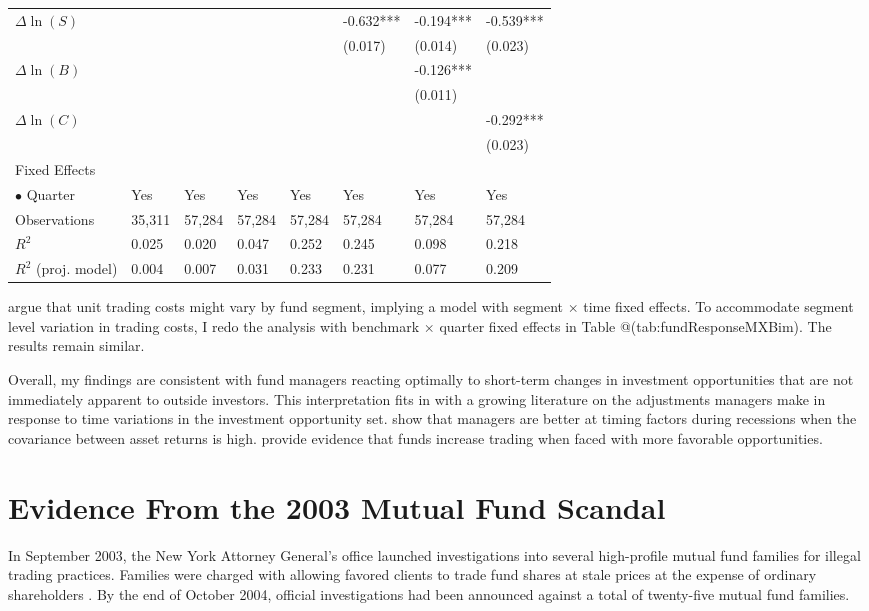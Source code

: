 \documentclass[openany]{book}
\theoremstyle{definition}
\theoremstyle{definition}
\theoremstyle{definition}
\theoremstyle{remark}
\begin{document}
\begin{table}[ht]
\begin{tabularx}{0.975\textwidth}{lYYYYYYY}
  $\Delta\ln(S)$ &  &  &  &  & -0.632*** & -0.194*** & -0.539*** \\ 
   &  &  &  &  & (0.017) & (0.014) & (0.023) \\ 
  $\Delta\ln(B)$ &  &  &  &  &  & -0.126*** &  \\ 
   &  &  &  &  &  & (0.011) &  \\ 
  $\Delta\ln(C)$ &  &  &  &  &  &  & -0.292*** \\ 
   &  &  &  &  &  &  & (0.023) \\ 
  Fixed Effects &  &  &  &  &  &  &  \\ 
  $\bullet$ Quarter & Yes & Yes & Yes & Yes & Yes & Yes & Yes \\ 
  Observations & 35,311 & 57,284 & 57,284 & 57,284 & 57,284 & 57,284 & 57,284 \\ 
  $R^2$ & 0.025 & 0.020 & 0.047 & 0.252 & 0.245 & 0.098 & 0.218 \\ 
  $R^2$ (proj. model) & 0.004 & 0.007 & 0.031 & 0.233 & 0.231 & 0.077 & 0.209 \\ 
   \bottomrule
\end{tabularx}
\endgroup
\end{table}

\citet{pst17L} argue that unit trading costs might vary by fund segment,
implying a model with segment \(\times\) time fixed effects. To
accommodate segment level variation in trading costs, I redo the
analysis with benchmark \(\times\) quarter fixed effects in Table
@(tab:fundResponseMXBim). The results remain similar.

Overall, my findings are consistent with fund managers reacting
optimally to short-term changes in investment opportunities that are not
immediately apparent to outside investors. This interpretation fits in
with a growing literature on the adjustments managers make in response
to time variations in the investment opportunity set. \citet{knv16} show
that managers are better at timing factors during recessions when the
covariance between asset returns is high. \citet{pst17} provide evidence
that funds increase trading when faced with more favorable
opportunities.

\chapter{Evidence From the 2003 Mutual Fund Scandal}\label{sec:scandal}

In September 2003, the New York Attorney General's office launched
investigations into several high-profile mutual fund families for
illegal trading practices. Families were charged with allowing favored
clients to trade fund shares at stale prices at the expense of ordinary
shareholders \citep{hw05, zitzewitz06}. By the end of October 2004,
official investigations had been announced against a total of
twenty-five mutual fund families.
\end{document}
